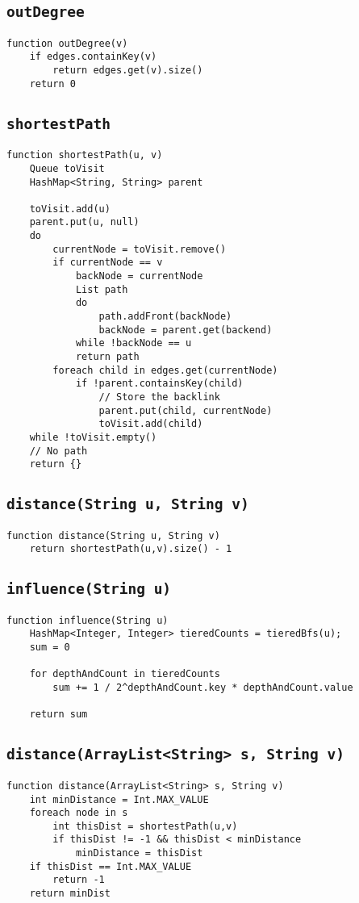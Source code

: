 \documentclass[10pt,letterpaper]{article}
\begin{document}
\subsection{\texttt{outDegree}}
\begin{verbatim}
function outDegree(v)
    if edges.containKey(v)
        return edges.get(v).size()
	return 0
\end{verbatim}
\subsection{\texttt{shortestPath}}
\begin{verbatim}
function shortestPath(u, v)
   	Queue toVisit
   	HashMap<String, String> parent

   	toVisit.add(u)
   	parent.put(u, null)
   	do
   	    currentNode = toVisit.remove()
   	    if currentNode == v
   	        backNode = currentNode
   	        List path
   	        do
   	            path.addFront(backNode)
   	            backNode = parent.get(backend)
   	        while !backNode == u
   	        return path
   	    foreach child in edges.get(currentNode)
   	        if !parent.containsKey(child)
   	            // Store the backlink
   	            parent.put(child, currentNode)
   	            toVisit.add(child)
   	while !toVisit.empty()
   	// No path
   	return {}
\end{verbatim}
\subsection{\texttt{distance(String u, String v)}}
\begin{verbatim}
function distance(String u, String v) 
   	return shortestPath(u,v).size() - 1
\end{verbatim}
\subsection{\texttt{influence(String u) }}
\begin{verbatim}
function influence(String u)
    HashMap<Integer, Integer> tieredCounts = tieredBfs(u);
    sum = 0

	for depthAndCount in tieredCounts
		sum += 1 / 2^depthAndCount.key * depthAndCount.value

	return sum
\end{verbatim}
\subsection{\texttt{distance(ArrayList<String> s, String v)}}
\begin{verbatim}
function distance(ArrayList<String> s, String v) 
    int minDistance = Int.MAX_VALUE
    foreach node in s
        int thisDist = shortestPath(u,v)
        if thisDist != -1 && thisDist < minDistance
            minDistance = thisDist
    if thisDist == Int.MAX_VALUE
        return -1
    return minDist
\end{verbatim}
\end{document}
